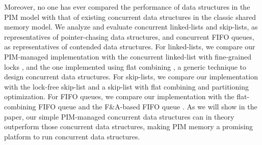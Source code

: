 Moreover, no one has ever compared the performance of data structures in the PIM model 
with that of existing concurrent data structures in the classic shared memory model. 
We analyze and evaluate concurrent linked-lists and skip-lists, 
as representatives of pointer-chasing data structures, and concurrent FIFO queues, 
as representatives of contended data structures.
For linked-lists, we compare our PIM-managed implementation with the concurrent linked-list with 
fine-grained locks \cite{Heller05}, and the one implemented using flat combining 
\cite{Hendler10}, a generic technique to design concurrent data structures.  
For skip-lists, we compare our implementation with the lock-free skip-list \cite{Herlihy08} 
and a skip-list with flat combining and partitioning optimization. 
For FIFO queues, we compare our implementation with the flat-combining FIFO queue 
\cite{Hendler10} and the F\&A-based FIFO queue \cite{Morrison13}.  
As we will show in the paper, our simple PIM-managed concurrent data structures can in theory 
outperform those concurrent data structures, 
making PIM memory a promising platform to run concurrent data structures.